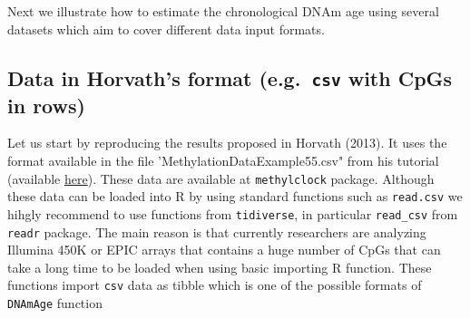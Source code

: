 \documentclass[]{article}
\begin{document}
Next we illustrate how to estimate the chronological DNAm age using several datasets which aim to cover different data input formats.

\hypertarget{data-in-horvaths-format-e.g.-csv-with-cpgs-in-rows}{%
\subsection{\texorpdfstring{Data in Horvath's format (e.g.~\texttt{csv} with CpGs in rows)}{Data in Horvath's format (e.g.~csv with CpGs in rows)}}\label{data-in-horvaths-format-e.g.-csv-with-cpgs-in-rows}}

Let us start by reproducing the results proposed in Horvath (2013). It uses the format available in the file 'MethylationDataExample55.csv" from his tutorial (available \href{https://dnamage.genetics.ucla.edu/home}{here}). These data are available at \texttt{methylclock} package. Although these data can be loaded into R by using standard functions such as \texttt{read.csv} we hihgly recommend to use functions from \texttt{tidiverse}, in particular \texttt{read\_csv} from \texttt{readr} package. The main reason is that currently researchers are analyzing Illumina 450K or EPIC arrays that contains a huge number of CpGs that can take a long time to be loaded when using basic importing R function. These functions import \texttt{csv} data as tibble which is one of the possible formats of \texttt{DNAmAge} function
\end{document}
